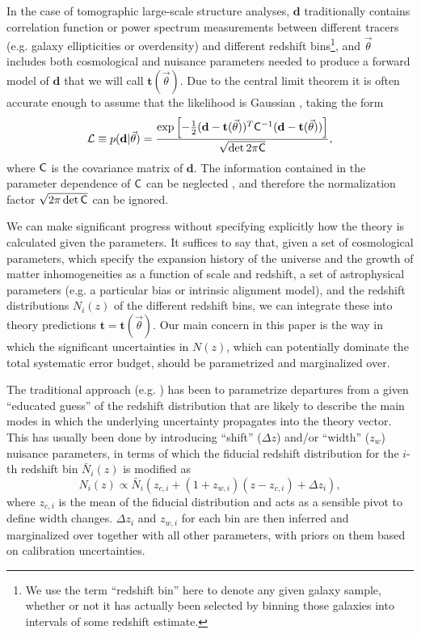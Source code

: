 \documentclass[a4paper,11pt]{article}
\newcommand{\vd}{\mathbf{d}}
\newcommand{\vt}{\mathbf{t}}
\begin{document}
      In the case of tomographic large-scale structure analyses, $\vd$ traditionally contains correlation function or power spectrum measurements between different tracers (e.g. galaxy ellipticities or overdensity) and different redshift bins\footnote{We use the term ``redshift bin'' here to denote any given galaxy sample, whether or not it has actually been selected by binning those galaxies into intervals of some redshift estimate.}, and $\vec{\theta}$ includes both cosmological and nuisance parameters needed to produce a forward model of $\vd$ that we will call $\vt(\vec{\theta})$. Due to the central limit theorem it is often accurate enough to assume that the likelihood is Gaussian \cite{2018MNRAS.473.2355S}, taking the form
      \begin{equation}
        \mathcal{L} \equiv p({\bf d}|\vec{\theta}) = \frac{\exp\left [-\frac{1}{2}(\vd-\vt(\vec{\theta}))^T{\sf C}^{-1}(\vd-\vt(\vec{\theta})) \right]}{\sqrt{\det{2\pi{\sf C}}}}, \label{eq:like}
     \end{equation}
      where ${\sf C}$ is the covariance matrix of $\vd$. The information contained in the parameter dependence of ${\sf C}$ can be neglected \citep{1811.11584}, and therefore the normalization factor $\sqrt{2\pi\det{\sf C}}$ can be ignored.

      We can make significant progress without specifying explicitly how the theory is calculated given the parameters. It suffices to say that, given a set of cosmological parameters, which specify the expansion history of the universe and the growth of matter inhomogeneities as a function of scale and redshift, a set of astrophysical parameters (e.g. a particular bias or intrinsic alignment model), and the redshift distributions $N_i(z)$ of the different redshift bins, we can integrate these into theory predictions $\vt=\vt(\vec{\theta})$. Our main concern in this paper is the way in which the significant uncertainties in $N(z)$, which can potentially dominate the total systematic error budget, should be parametrized and marginalized over.

      The traditional approach (e.g. \cite{2018PhRvD..98d3526A,2019PASJ...71...43H,1912.08209,2020A&A...637A.100W}) has been to parametrize departures from a given ``educated guess'' of the redshift distribution that are likely to describe the main modes in which the underlying uncertainty propagates into the theory vector. This has usually been done by introducing ``shift'' ($\Delta z$) and/or ``width'' ($z_w$) nuisance parameters, in terms of which the fiducial redshift distribution for the $i$-th redshift bin $\bar{N}_i(z)$ is modified as
      \begin{equation}
        N_{i}(z) \propto \bar{N}_{i}\left(z_{c,i} + (1 + z_{w, i})(z-z_{c, i}) + \Delta z_{i}\right), \label{eq:photo-z-model}
      \end{equation}
      where $z_{c,i}$ is the mean of the fiducial distribution and acts as a sensible pivot to define width changes. $\Delta z_i$ and $z_{w,i}$ for each bin are then inferred and marginalized over together with all other parameters, with priors on them based on calibration uncertainties.
\end{document}
